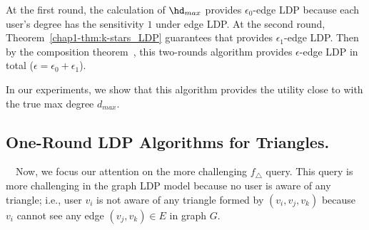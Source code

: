 
At the first round, the calculation of $\hd_{max}$  provides $\epsilon_0$-edge LDP because each user's degree has the sensitivity $1$ under edge LDP. 
At the second round, Theorem~\ref{chap1-thm:k-stars_LDP} guarantees that 
 provides $\epsilon_1$-edge LDP. 
Then by the composition theorem~\cite{DP}, this two-rounds algorithm provides $\epsilon$-edge LDP in total ($\epsilon =\epsilon_0 + \epsilon_1$). 

In our experiments, we show that this algorithm provides the utility close to  with the true max degree $d_{max}$. 

\subsection{One-Round LDP Algorithms for Triangles.}
\label{chap1-sub:non-interactive_triangles}
~~Now, we focus our attention on the more challenging $f_\triangle$ query. This
query is more challenging in the graph LDP model because no user is aware of any
triangle; i.e., user $v_i$ is not aware of any triangle formed by $(v_i, v_j, v_k)$ because $v_i$ cannot see any edge $(v_j, v_k) \in E$ in graph $G$. 

